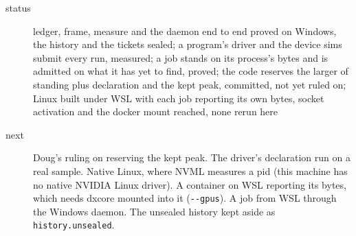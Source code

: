 \begin{description}
\item[{status}] ledger, frame, measure and the daemon end to end proved on Windows, the history and the tickets sealed; a program's driver and the device sims submit every run, measured; a job stands on its process's bytes and is admitted on what it has yet to find, proved; the code reserves the larger of standing plus declaration and the kept peak, committed, not yet ruled on; Linux built under WSL with each job reporting its own bytes, socket activation and the docker mount reached, none rerun here
\item[{next}] Doug's ruling on reserving the kept peak. The driver's declaration run on a real sample. Native Linux, where NVML measures a pid (this machine has no native NVIDIA Linux driver). A container on WSL reporting its bytes, which needs dxcore mounted into it (\texttt{-\allowbreak{}-\allowbreak{}gpus}). A job from WSL through the Windows daemon. The unsealed history kept aside as \texttt{history.\allowbreak{}unsealed}.
\end{description}

